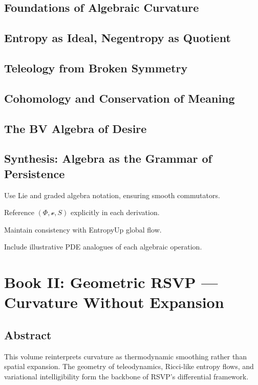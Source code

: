 \documentclass[12pt,oneside]{book}
\newcommand{\PhiField}{\ensuremath{\Phi}}
\newcommand{\vField}{\ensuremath{\boldsymbol{\mathcal{v}}}}
\newcommand{\SEntropy}{\ensuremath{S}}
\newcommand{\RSVPTriple}{\ensuremath{(\PhiField, \vField, \SEntropy)}}
\begin{document}
\chapter{Foundations of Algebraic Curvature}
\chapter{Entropy as Ideal, Negentropy as Quotient}
\chapter{Teleology from Broken Symmetry}
\chapter{Cohomology and Conservation of Meaning}
\chapter{The BV Algebra of Desire}
\chapter{Synthesis: Algebra as the Grammar of Persistence}

\begin{botinstructions}
  \item Use Lie and graded algebra notation, ensuring smooth commutators.
  \item Reference $\RSVPTriple$ explicitly in each derivation.
  \item Maintain consistency with EntropyUp global flow.
  \item Include illustrative PDE analogues of each algebraic operation.
\end{botinstructions}

\part{Book II: Geometric RSVP — Curvature Without Expansion}

\chapter*{Abstract}
This volume reinterprets curvature as thermodynamic smoothing rather than spatial expansion.
The geometry of teleodynamics, Ricci-like entropy flows, and variational intelligibility
form the backbone of RSVP’s differential framework.
\end{document}
